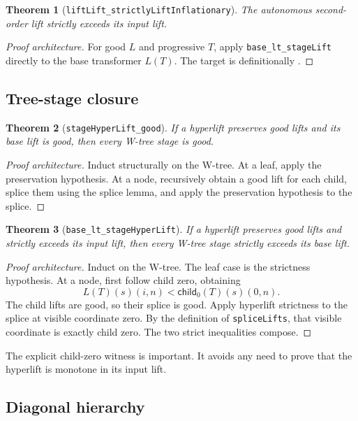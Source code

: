 \documentclass[11pt]{article}
\newtheorem{theorem}{Theorem}[section]
\theoremstyle{definition}
\theoremstyle{remark}
\newcommand{\lean}[1]{\nolinkurl{#1}}
\newcommand{\leancode}[1]{\texttt{\detokenize{#1}}}
\begin{document}
\begin{theorem}[\lean{liftLift_strictlyLiftInflationary}]
The autonomous second-order lift strictly exceeds its input lift.
\end{theorem}

\begin{proof}[Proof architecture]
For good $L$ and progressive $T$, apply \lean{base_lt_stageLift} directly to
the base transformer $L(T)$. The target is definitionally \leancode{liftLift L T}.
\end{proof}

\subsection{Tree-stage closure}

\begin{theorem}[\lean{stageHyperLift_good}]
If a hyperlift preserves good lifts and its base lift is good, then every W-tree
stage is good.
\end{theorem}

\begin{proof}[Proof architecture]
Induct structurally on the W-tree. At a leaf, apply the preservation hypothesis.
At a node, recursively obtain a good lift for each child, splice them using the
splice lemma, and apply the preservation hypothesis to the splice.
\end{proof}

\begin{theorem}[\lean{base_lt_stageHyperLift}]
If a hyperlift preserves good lifts and strictly exceeds its input lift, then
every W-tree stage strictly exceeds its base lift.
\end{theorem}

\begin{proof}[Proof architecture]
Induct on the W-tree. The leaf case is the strictness hypothesis. At a node,
first follow child zero, obtaining
\[
  L(T)(s)(i,n)
  < \mathsf{child}_0(T)(s)(0,n).
\]
The child lifts are good, so their splice is good. Apply hyperlift strictness to
the splice at visible coordinate zero. By the definition of \lean{spliceLifts},
that visible coordinate is exactly child zero. The two strict inequalities
compose.
\end{proof}

The explicit child-zero witness is important. It avoids any need to prove that
the hyperlift is monotone in its input lift.

\subsection{Diagonal hierarchy}
\end{document}
